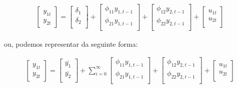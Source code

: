 \begin{align} \label{var1mat}
\begin{bmatrix}
    y_{1t} \\
    y_{2t}
\end{bmatrix}
=
\begin{bmatrix}
    \delta_1 \\
    \delta_2 \\
\end{bmatrix}
+
\begin{bmatrix}
    \phi_{11}y_{1,t-1} \\
    \phi_{21}y_{1,t-1} \\
\end{bmatrix}
+
\begin{bmatrix}
    \phi_{12}y_{2,t-1} \\
    \phi_{22}y_{2,t-1} \\
\end{bmatrix}
+
\begin{bmatrix}
    u_{1t} \\
    u_{2t} \\
\end{bmatrix}    
\end{align}

\noindent
ou, podemos representar da seguinte forma:

\begin{align} \label{var1mat}
\begin{bmatrix}
    y_{1t} \\
    y_{2t}
\end{bmatrix}
=
\begin{bmatrix}
    \overline{y_1} \\
    \overline{y_2} \\
\end{bmatrix}
+ \sum_{i=0}^{\infty}
\begin{bmatrix}
    \phi_{11}y_{1,t-1} \\
    \phi_{21}y_{1,t-1} \\
\end{bmatrix}
+
\begin{bmatrix}
    \phi_{12}y_{2,t-1} \\
    \phi_{22}y_{2,t-1} \\
\end{bmatrix}
+
\begin{bmatrix}
    u_{1t} \\
    u_{2t} \\
\end{bmatrix}    
\end{align}
